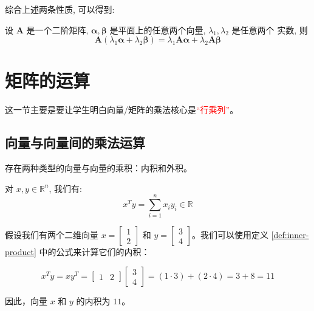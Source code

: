 \documentclass[lang=cn,newtx,10pt,scheme=chinese]{elegantbook}
\begin{document}
综合上述两条性质, 可以得到:

设 $\boldsymbol{A}$ 是一个二阶矩阵, $\boldsymbol{\alpha}, \boldsymbol{\beta}$ 是平面上的任意两个向量, $\lambda_1, \lambda_2$ 是任意两个 实数, 则
\begin{equation}
  \boldsymbol{A}\left(\lambda_1 \boldsymbol{\alpha}+\lambda_2 \boldsymbol{\beta}\right)=\lambda_1 \boldsymbol{A} \boldsymbol{\alpha}+\lambda_2 \boldsymbol{A} \boldsymbol{\beta}
\end{equation}


\section{矩阵的运算}

\begin{note}
这一节主要是要让学生明白向量/矩阵的乘法核心是\textcolor{red}{“行乘列”}。
\end{note}

\subsection{向量与向量间的乘法运算}

存在两种类型的向量与向量的乘积：内积和外积。

\begin{definition}[内积] \label{def:inner-product} 
对 $x, y \in \mathbb{R}^n$, 我们有:
$$
x^T y=\sum_{i=1}^n x_i y_i \in \mathbb{R}
$$
\end{definition}

\begin{exercise}\label{exer:01}
假设我们有两个二维向量 $x = \begin{bmatrix} 1 \\ 2 \end{bmatrix}$ 和 $y = \begin{bmatrix} 3 \\ 4 \end{bmatrix}$。我们可以使用定义 \ref{def:inner-product} 中的公式来计算它们的内积：

\[
x^T y = x y^T = \begin{bmatrix} 1 & 2 \end{bmatrix} \begin{bmatrix} 3 \\ 4 \end{bmatrix} = (1 \cdot 3) + (2 \cdot 4) = 3 + 8 = 11
\]

因此，向量 $x$ 和 $y$ 的内积为 $11$。
\end{exercise}
\end{document}
